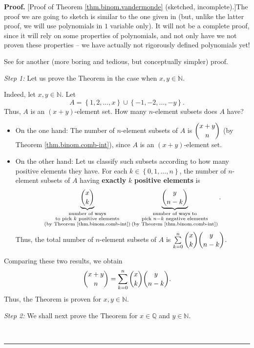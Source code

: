 \documentclass[numbers=enddot,12pt,final,onecolumn,notitlepage]{scrartcl}%
\numberwithin{exer}{subsection}
\theoremstyle{definition}
\newenvironment{proof}[1][Proof]{\noindent\textbf{#1.} }{\ \rule{0.5em}{0.5em}}
\let\sumnonlimits\sum
\renewcommand{\sum}{\sumnonlimits\limits}
\begin{document}
\begin{proof}
[Proof of Theorem \ref{thm.binom.vandermonde} (sketched, incomplete).]The
proof we are going to sketch is similar to the one given in \cite[\S 3.3.3]%
{detnotes} (but, unlike the latter proof, we will use polynomials in $1$
variable only). It will not be a complete proof, since it will rely on some
properties of polynomials, and not only have we not proven these properties --
we have actually not rigorously defined polynomials yet!

See \cite[\S 3.3.2]{detnotes} for another (more boring and tedious, but
conceptually simpler) proof.

\textit{Step 1:} Let us prove the Theorem in the case when $x,y\in\mathbb{N}$.

Indeed, let $x,y\in\mathbb{N}$. Let%
\[
A=\left\{  1,2,\ldots,x\right\}  \cup\left\{  -1,-2,\ldots,-y\right\}  .
\]
Thus, $A$ is an $\left(  x+y\right)  $-element set. How many $n$-element
subsets does $A$ have?

\begin{itemize}
\item On the one hand: The number of $n$-element subsets of $A$ is
$\dbinom{x+y}{n}$ (by Theorem \ref{thm.binom.comb-int}), since $A$ is an
$\left(  x+y\right)  $-element set.

\item On the other hand: Let us classify such subsets according to how many
positive elements they have. For each $k\in\left\{  0,1,\ldots,n\right\}  $,
the number of $n$-element subsets of $A$ having \textbf{exactly }$k$
\textbf{positive elements} is
\[
\underbrace{\dbinom{x}{k}}_{\substack{\text{number of ways}\\\text{to pick
}k\text{ positive elements}\\\text{(by Theorem \ref{thm.binom.comb-int})}%
}}\underbrace{\dbinom{y}{n-k}}_{\substack{\text{number of ways to}\\\text{pick
}n-k\text{ negative elements}\\\text{(by Theorem \ref{thm.binom.comb-int})}%
}}.
\]
Thus, the total number of $n$-element subsets of $A$ is $\sum\limits_{k=0}%
^{n}\dbinom{x}{k}\dbinom{y}{n-k}$.
\end{itemize}

Comparing these two results, we obtain%
\[
\dbinom{x+y}{n}=\sum_{k=0}^{n}\dbinom{x}{k}\dbinom{y}{n-k}.
\]
Thus, the Theorem is proven for $x,y\in\mathbb{N}$.

\textit{Step 2:} We shall next prove the Theorem for $x\in\mathbb{Q}$ and
$y\in\mathbb{N}$.


\end{proof}
\end{document}
